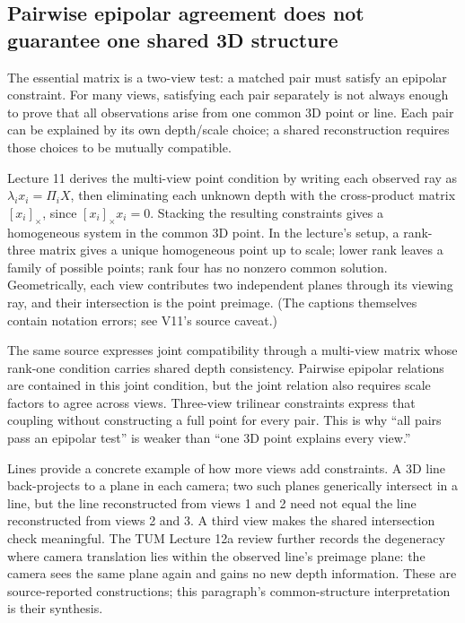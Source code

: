 \subsection{Pairwise epipolar agreement does not guarantee one shared 3D structure}\label{02-foundations-ii-ch036-pairwise-epipolar-agreement-does-not-guarantee-one-shared-3d-structure}

The essential matrix is a two-view test: a matched pair must satisfy an epipolar constraint. For many views, satisfying each pair separately is not always enough to prove that all observations arise from one common 3D point or line. Each pair can be explained by its own depth/scale choice; a shared reconstruction requires those choices to be mutually compatible.

Lecture 11 derives the multi-view point condition by writing each observed ray as \(\lambda_i x_i=\Pi_iX\), then eliminating each unknown depth with the cross-product matrix \([x_i]_\times\), since \([x_i]_\times x_i=0\). Stacking the resulting constraints gives a homogeneous system in the common 3D point. In the lecture's setup, a rank-three matrix gives a unique homogeneous point up to scale; lower rank leaves a family of possible points; rank four has no nonzero common solution. Geometrically, each view contributes two independent planes through its viewing ray, and their intersection is the point preimage. (The captions themselves contain notation errors; see V11's source caveat.)

The same source expresses joint compatibility through a multi-view matrix whose rank-one condition carries shared depth consistency. Pairwise epipolar relations are contained in this joint condition, but the joint relation also requires scale factors to agree across views. Three-view trilinear constraints express that coupling without constructing a full point for every pair. This is why ``all pairs pass an epipolar test'' is weaker than ``one 3D point explains every view.''

Lines provide a concrete example of how more views add constraints. A 3D line back-projects to a plane in each camera; two such planes generically intersect in a line, but the line reconstructed from views 1 and 2 need not equal the line reconstructed from views 2 and 3. A third view makes the shared intersection check meaningful. The TUM Lecture 12a review further records the degeneracy where camera translation lies within the observed line's preimage plane: the camera sees the same plane again and gains no new depth information. These are source-reported constructions; this paragraph's common-structure interpretation is their synthesis.

